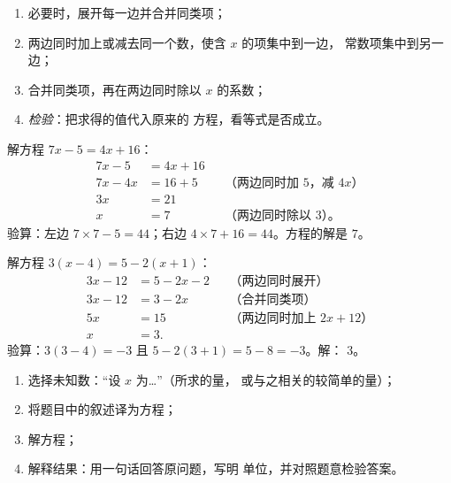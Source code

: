 \begin{method}[解一元一次方程]\label{met:g8:equations:solve}
\begin{enumerate}
  \item 必要时，展开每一边并合并同类项；
  \item 两边同时加上或减去同一个数，使含 $x$ 的项集中到一边，
        常数项集中到另一边；
  \item 合并同类项，再在两边同时除以 $x$ 的系数；
  \item \emph{检验}：把求得的值代入原来的
        方程，看等式是否成立。
\end{enumerate}
\end{method}

\begin{example}\label{ex:g8:equations:solve}
解方程 $7x - 5 = 4x + 16$：
\begin{align*}
7x - 5 &= 4x + 16 \\
7x - 4x &= 16 + 5
&& \text{（两边同时加 $5$，减 $4x$）} \\
3x &= 21 \\
x &= 7 && \text{（两边同时除以 3）。}
\end{align*}
验算：左边 $7 \times 7 - 5 = 44$；右边
$4 \times 7 + 16 = 44$。方程的解是 $7$。
\end{example}

\begin{example}[含括号与负数的情形]\label{ex:g8:equations:brackets}
解方程 $3(x - 4) = 5 - 2(x + 1)$：
\begin{align*}
3x - 12 &= 5 - 2x - 2 && \text{（两边同时展开）} \\
3x - 12 &= 3 - 2x && \text{（合并同类项）} \\
5x &= 15 && \text{（两边同时加上 $2x + 12$）} \\
x &= 3 .
\end{align*}
验算：$3(3 - 4) = -3$ 且 $5 - 2(3+1) = 5 - 8 = -3$。\quad 解：
$3$。
\end{example}

\begin{method}[用方程解应用题]\label{met:g8:equations:problem}
\begin{enumerate}
  \item 选择未知数：“设 $x$ 为\dots”（所求的量，
        或与之相关的较简单的量）；
  \item 将题目中的叙述译为方程；
  \item 解方程；
  \item 解释结果：用一句话回答原问题，写明
        单位，并对照题意检验答案。
\end{enumerate}
\end{method}

